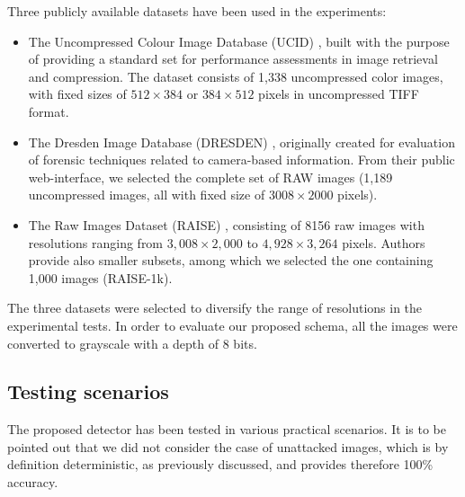 \documentclass[review]{elsarticle}
\begin{document}
Three publicly available datasets have been used in the experiments:
\begin{itemize}
	\item The Uncompressed Colour Image Database (UCID) \cite{schaefer2003ucid}, built with the purpose of providing a standard set for performance assessments in image retrieval and compression. The dataset consists of 1,338 uncompressed color images, with fixed sizes of $512\times384$ or $384\times512$ pixels in uncompressed TIFF format.
	\item The Dresden Image Database (DRESDEN) \cite{gloe2010dresden}, originally created for evaluation of forensic techniques related to camera-based information. From their public web-interface, we selected the complete set of RAW images (1,189 uncompressed images, all with fixed size of $3008\times2000$ pixels).
	\item The Raw Images Dataset (RAISE) \cite{dang2015raise}, consisting of 8156 raw images with resolutions ranging from $3,008\times2,000$ to $4,928\times3,264$ pixels. Authors provide also smaller subsets, among which we selected the one containing 1,000 images (RAISE-1k).
\end{itemize}

The three datasets were selected to diversify the range of resolutions in the experimental tests. In order to evaluate our proposed schema, all the images were converted to grayscale with a depth of 8 bits.

\subsection{Testing scenarios}
\label{subsec:test_scenarios}
The proposed detector has been tested in various practical scenarios. It is to be pointed out that we did not consider the case of unattacked images, which is by definition deterministic, as previously discussed, and provides therefore 100\% accuracy.
\end{document}
